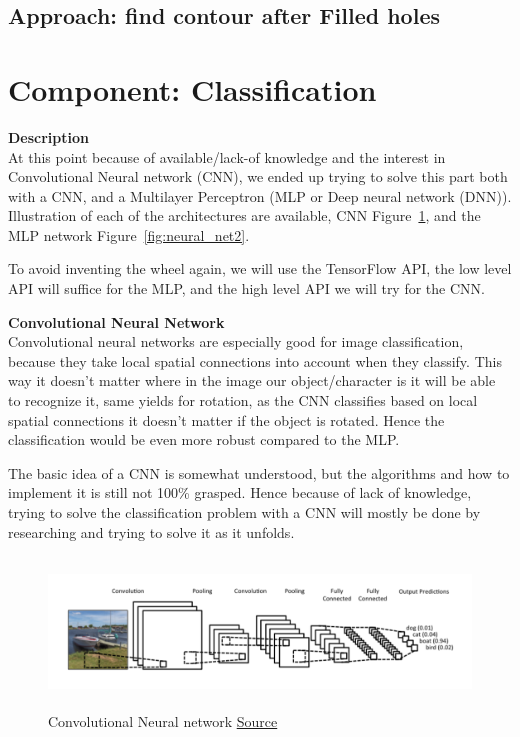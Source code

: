 \documentclass[11pt,a4paper,UKenglish]{report}
\begin{document}
\subsection{Approach: find contour after Filled holes}



\section{Component: Classification}
\label{Method:Classification}
\textbf{Description} \\



At this point because of available/lack-of knowledge and the interest in
Convolutional Neural network (CNN), we ended up trying to solve this part
both with a CNN, and a Multilayer Perceptron (MLP or Deep neural network (DNN)).
Illustration of each of the architectures are available, CNN Figure~\ref{fig:CNN_architecture},
and the MLP network Figure~\ref{fig:neural_net2}. \par
To avoid inventing the wheel again, we will use the TensorFlow API, the low
level API will suffice for the MLP, and the high level API we will try for the
CNN.

\begin{flushleft}
  \textbf{Convolutional Neural Network} \\
  Convolutional neural networks are especially good for image
  classification, because they take local spatial connections into account when
  they classify. This way it doesn't matter where in the image our
  object/character is it will be able to recognize it, same yields for rotation,
  as the CNN classifies based on local spatial connections it doesn't matter if
  the object is rotated. Hence the classification would be even more robust
  compared to the MLP. \par
  The basic idea of a CNN is somewhat understood, but the algorithms and how to
  implement it is still not 100\% grasped. Hence because of lack of knowledge,
  trying to solve the classification problem with a CNN will mostly be done
  by researching and trying to solve it as it unfolds.
\end{flushleft}

\begin{figure}[H]
  \centering
  \includegraphics[height=4cm]{res/CNN_architecture.png}
  \caption{Convolutional Neural network \href{ http://www.wildml.com/2015/11/understanding-convolutional-neural-networks-for-nlp/}{Source}}
  \label{fig:CNN_architecture}
\end{figure}
\end{document}
